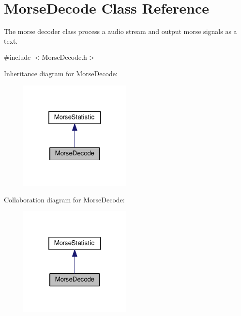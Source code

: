 \hypertarget{classMorseDecode}{}\section{Morse\+Decode Class Reference}
\label{classMorseDecode}


The morse decoder class process a audio stream and output morse signals as a text.  




{\ttfamily \#include $<$Morse\+Decode.\+h$>$}



Inheritance diagram for Morse\+Decode\+:\nopagebreak
\begin{figure}[H]
\begin{center}
\leavevmode
\includegraphics[width=160pt]{classMorseDecode__inherit__graph}
\end{center}
\end{figure}


Collaboration diagram for Morse\+Decode\+:\nopagebreak
\begin{figure}[H]
\begin{center}
\leavevmode
\includegraphics[width=160pt]{classMorseDecode__coll__graph}
\end{center}
\end{figure}
